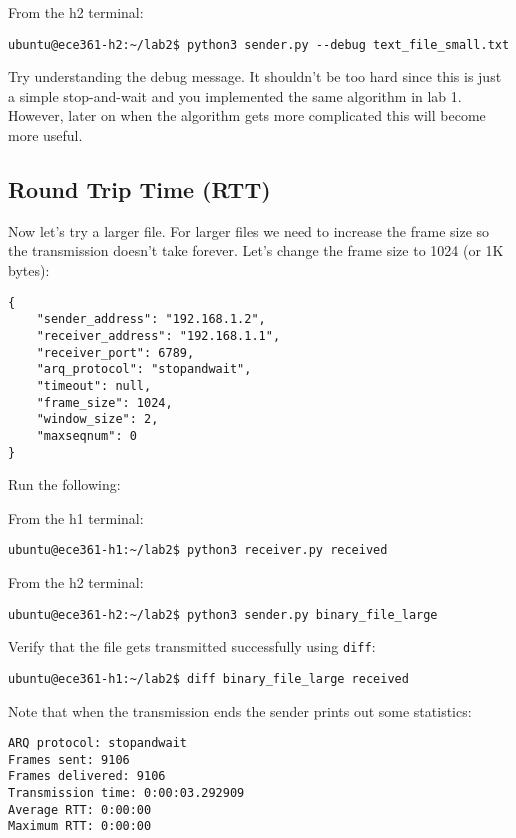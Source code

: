 \documentclass[11pt]{article}
\begin{document}
From the h2 terminal:
\begin{lstlisting}[style=ece361-shell-base, caption={}]
ubuntu@ece361-h2:~/lab2$ python3 sender.py --debug text_file_small.txt
\end{lstlisting}

Try understanding the debug message. It shouldn't be too hard since this is just a simple stop-and-wait and you implemented the same algorithm in lab 1. However, later on when the algorithm gets more complicated this will become more useful.

\subsection{Round Trip Time (RTT)}
Now let's try a larger file. For larger files we need to increase the frame size so the transmission doesn't take forever. Let's change the frame size to 1024 (or 1K bytes):
\begin{lstlisting}[style=ece361-shell-base, caption={Configuration For Large File}]
{
    "sender_address": "192.168.1.2",
    "receiver_address": "192.168.1.1",
    "receiver_port": 6789,
    "arq_protocol": "stopandwait",
    "timeout": null,
    "frame_size": 1024,
    "window_size": 2,
    "maxseqnum": 0
}
\end{lstlisting}
Run the following:

From the h1 terminal:
\begin{lstlisting}[style=ece361-shell-base, caption={}]
ubuntu@ece361-h1:~/lab2$ python3 receiver.py received
\end{lstlisting}

From the h2 terminal:
\begin{lstlisting}[style=ece361-shell-base, caption={}]
ubuntu@ece361-h2:~/lab2$ python3 sender.py binary_file_large
\end{lstlisting}


Verify that the file gets transmitted successfully using \texttt{diff}:
\begin{lstlisting}[style=ece361-shell-base, caption={}]
ubuntu@ece361-h1:~/lab2$ diff binary_file_large received
\end{lstlisting}

Note that when the transmission ends the sender prints out some statistics:

\begin{lstlisting}[style=ece361-shell-base, caption={}]
ARQ protocol: stopandwait
Frames sent: 9106
Frames delivered: 9106
Transmission time: 0:00:03.292909
Average RTT: 0:00:00
Maximum RTT: 0:00:00
\end{lstlisting}
\end{document}
